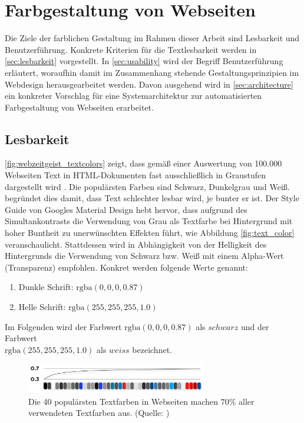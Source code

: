 \section{Farbgestaltung von Webseiten}
\label{sec:farbgestaltung}
Die Ziele der farblichen Gestaltung im Rahmen dieser Arbeit sind Lesbarkeit und Benutzerführung. Konkrete Kriterien für die Textlesbarkeit werden in \autoref{sec:lesbarkeit} vorgestellt. In  \autoref{sec:usability} wird der Begriff Benutzerführung erläutert, woraufhin damit im Zusammenhang stehende Gestaltungsprinzipien im Webdesign herausgearbeitet werden. Davon ausgehend wird in \autoref{sec:architecture} ein konkreter Vorschlag für eine Systemarchitektur zur automatisierten Farbgestaltung von Webseiten erarbeitet.

\subsection{Lesbarkeit}
\label{sec:lesbarkeit}


\autoref{fig:webzeitgeist_textcolors} zeigt, dass gemäß einer Auswertung von 100.000 Webseiten Text in HTML-Dokumenten fast ausschließlich in Graustufen dargestellt wird \citep{webzeitgeist}. Die populärsten Farben sind Schwarz, Dunkelgrau und Weiß. \citet{webdesign} begründet dies damit, dass Text schlechter lesbar wird, je bunter er ist. Der Style Guide von Googles Material Design \citep{google} hebt hervor, dass aufgrund des Simultankontrasts die Verwendung von Grau als Textfarbe bei Hintergrund mit hoher Buntheit zu unerwünschten Effekten führt, wie Abbildung \ref{fig:text_color} veranschaulicht. Stattdessen wird in Abhängigkeit von der Helligkeit des Hintergrunds die Verwendung von Schwarz bzw. Weiß mit einem Alpha-Wert (Transparenz) empfohlen. Konkret werden folgende Werte genannt:
\begin{enumerate}
	\item Dunkle Schrift: $\text{rgba}(0, 0, 0, 0.87)$
	\item Helle Schrift: $\text{rgba}(255, 255, 255, 1.0)$
\end{enumerate}

Im Folgenden wird der Farbwert $\text{rgba}(0, 0, 0, 0.87)$ als $schwarz$ und der Farbwert\\$\text{rgba}(255, 255, 255, 1.0)$ als $weiss$ bezeichnet.

\begin{figure}[h]
	\centering
	\includegraphics[width=0.7\textwidth]{img/webzeitgeist_textcolors.png}
	\caption{Die 40 populärsten Textfarben in Webseiten machen $70\%$ aller verwendeten Textfarben aus. (Quelle: \citep{webzeitgeist})}
	\label{fig:webzeitgeist_textcolors}
\end{figure}

